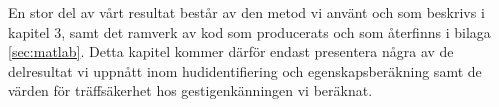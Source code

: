 \documentclass[../rapport_MVEX01-11-05]{subfiles}
\begin{document}
En stor del av vårt resultat består av den metod vi använt och
som beskrivs i kapitel 3, samt
det ramverk av kod som producerats och som återfinns i bilaga 
\ref{sec:matlab}. Detta kapitel kommer därför endast presentera
några av de delresultat vi uppnått inom hudidentifiering och 
egenskapsberäkning samt de värden för träffsäkerhet hos gestigenkänningen
vi beräknat.
\end{document}
